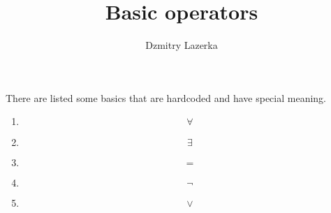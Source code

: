 \documentclass{article}
\title{Basic operators}
\author{Dzmitry Lazerka}
\begin{document}
\newenvironment{wikimathdb}[1]{$$}{$$}


There are listed some basics that are hardcoded and have special
meaning.
\begin{enumerate}

\item
\begin{wikimathdb}{define}
\forall
\end{wikimathdb}

\item
\begin{wikimathdb}{define}
\exists
\end{wikimathdb}

\item
\begin{wikimathdb}{define}
=
\end{wikimathdb}

\item
\begin{wikimathdb}{define}
\neg
\end{wikimathdb}

\item
\begin{wikimathdb}{define}
\vee
\end{wikimathdb}


\end{enumerate}
\end{document}
